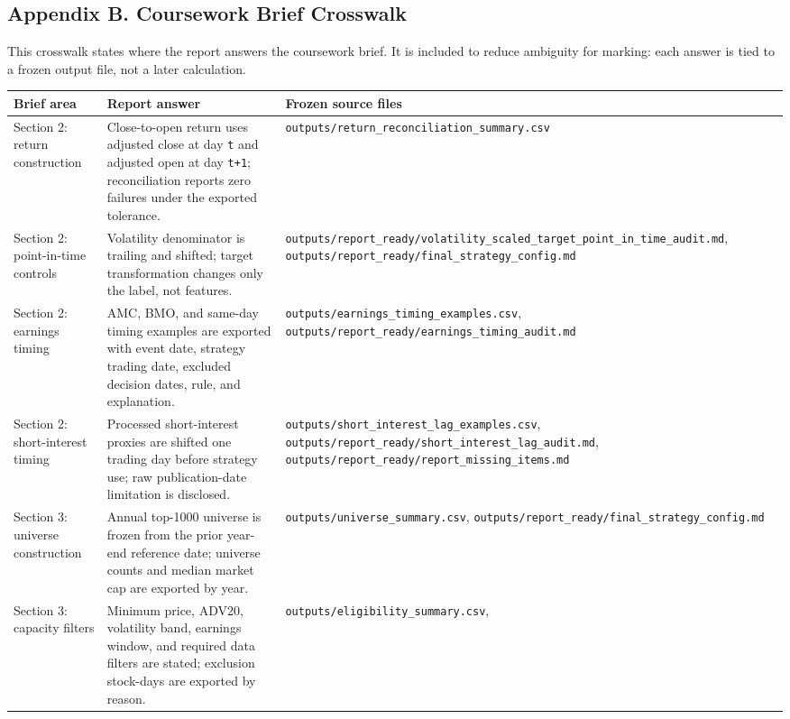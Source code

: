 \documentclass[
]{article}
\begin{document}
\hypertarget{appendix-b-coursework-brief-crosswalk}{%
\subsection{Appendix B. Coursework Brief
Crosswalk}\label{appendix-b-coursework-brief-crosswalk}}

This crosswalk states where the report answers the coursework brief. It
is included to reduce ambiguity for marking: each answer is tied to a
frozen output file, not a later calculation.

\begin{longtable}[]{@{}lll@{}}
\toprule
Brief area & Report answer & Frozen source files \\
\midrule
\endhead
Section 2: return construction & Close-to-open return uses adjusted
close at day \texttt{t} and adjusted open at day \texttt{t+1};
reconciliation reports zero failures under the exported tolerance. &
\texttt{outputs/return\_reconciliation\_summary.csv} \\
Section 2: point-in-time controls & Volatility denominator is trailing
and shifted; target transformation changes only the label, not features.
&
\texttt{outputs/report\_ready/volatility\_scaled\_target\_point\_in\_time\_audit.md},
\texttt{outputs/report\_ready/final\_strategy\_config.md} \\
Section 2: earnings timing & AMC, BMO, and same-day timing examples are
exported with event date, strategy trading date, excluded decision
dates, rule, and explanation. &
\texttt{outputs/earnings\_timing\_examples.csv},
\texttt{outputs/report\_ready/earnings\_timing\_audit.md} \\
Section 2: short-interest timing & Processed short-interest proxies are
shifted one trading day before strategy use; raw publication-date
limitation is disclosed. &
\texttt{outputs/short\_interest\_lag\_examples.csv},
\texttt{outputs/report\_ready/short\_interest\_lag\_audit.md},
\texttt{outputs/report\_ready/report\_missing\_items.md} \\
Section 3: universe construction & Annual top-1000 universe is frozen
from the prior year-end reference date; universe counts and median
market cap are exported by year. &
\texttt{outputs/universe\_summary.csv},
\texttt{outputs/report\_ready/final\_strategy\_config.md} \\
Section 3: capacity filters & Minimum price, ADV20, volatility band,
earnings window, and required data filters are stated; exclusion
stock-days are exported by reason. &
\texttt{outputs/eligibility\_summary.csv},

\end{longtable}
\end{document}
